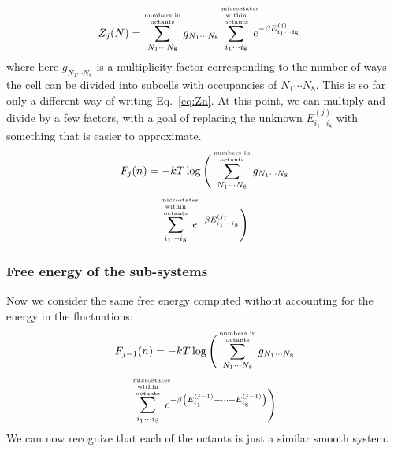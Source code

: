 \documentclass[letterpaper,twocolumn,amsmath,amssymb,pre,aps,10pt]{revtex4-1}
\begin{document}
\newcommand\summicrostatesofoctants{
  \sum_{i_1\cdots i_8}^{\text{\tiny\begin{minipage}{4em}
      \begin{center}
      \tiny microstates\\within octants\end{center}\end{minipage}}}
}
\begin{align}
  Z_j(N) &= \sumoccupanciesofoctants g_{N_1\cdots N_8}
       \summicrostatesofoctants
       e^{-\beta E_{i_1\cdots i_8}^{(j)}}
\end{align}
where here $g_{N_1\cdots N_8}$ is a multiplicity factor
corresponding to the number of ways the cell can be divided into
subcells with occupancies of $N_1\cdots N_8$.  This is so far only a
different way of writing Eq.~\ref{eq:Zn}.  At this point, we can
multiply and divide by a few factors, with a goal of replacing the
unknown $E_{i_1\cdots i_8}^{(j)}$ with something that is easier to
approximate.
\begin{multline}
  F_j(n) = -kT\log\Bigg(
    \sumoccupanciesofoctants
       g_{N_1\cdots N_8}
       \\
       \summicrostatesofoctants
       e^{-\beta E_{i_1\cdots i_8}^{(j)}}
  \Bigg)
\end{multline}

\subsubsection{Free energy of the sub-systems}

Now we consider the same free energy computed without accounting for
the energy in the fluctuations:
\begin{multline}
  F_{j-1}(n) = -kT\log\Bigg(
    \sumoccupanciesofoctants
       g_{N_1\cdots N_8}
       \\
       \summicrostatesofoctants
       e^{-\beta \left(E_{i_1}^{(j-1)} + \cdots + E_{i_8}^{(j-1)}\right)}
  \Bigg)\label{eq:Fjm1}
\end{multline}
We can now recognize that each of the octants is just a similar smooth
system.
\end{document}
